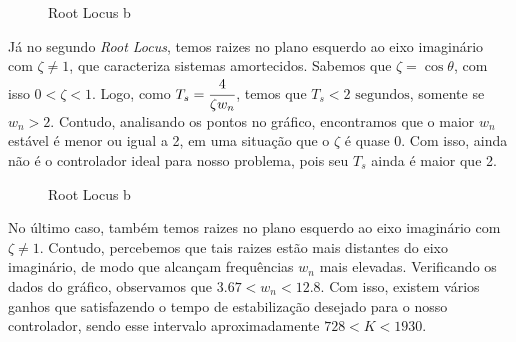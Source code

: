 \documentclass[a4paper,11pt]{article}
\begin{document}
\begin{figure}[H]
	\caption{Root Locus b}
	\label{fig:key}
\end{figure}

Já no segundo \textit{Root Locus}, temos raizes no plano esquerdo ao eixo imaginário com $\zeta \neq 1$, que caracteriza sistemas amortecidos. Sabemos que $ \zeta = \cos\theta$, com isso $0<\zeta<1$. Logo, como $T_s=\cfrac{4}{\zeta w_n} $, temos que $T_s<2\text{ segundos}$, somente se $w_n>2$. Contudo, analisando os pontos no gráfico, encontramos que o maior $w_n$ estável é menor ou igual a 2, em uma situação que o $\zeta$ é quase 0. Com isso, ainda não é o controlador ideal para nosso problema, pois seu $ T_s$ ainda é maior que 2.

\begin{figure}[H]
	\caption{Root Locus b}
	\label{fig:key}
\end{figure}

No último caso, também temos raizes no plano esquerdo ao eixo imaginário com $\zeta\neq1$. Contudo, percebemos que tais raizes estão mais distantes do eixo imaginário, de modo que alcançam frequências $w_n$ mais elevadas. Verificando os dados do gráfico, observamos que $3.67<w_n<12.8$. Com isso, existem vários ganhos que satisfazendo o tempo de estabilização desejado para o nosso controlador, sendo esse intervalo aproximadamente $ 728<K<1930 $.
\end{document}
